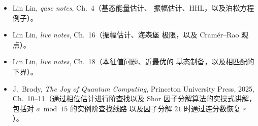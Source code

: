 \readingsection
\begin{itemize}[leftmargin=1.4em]
  \item Lin Lin, \emph{qasc notes}, Ch.~4（基态能量估计、
        振幅估计、HHL，以及泊松方程例子）。
  \item Lin Lin, \emph{live notes}, Ch.~16（振幅估计、海森堡
        极限，以及 Cram\'er--Rao 观点）。
  \item Lin Lin, \emph{live notes}, Ch.~18（本征值问题、近最优的
        基态制备，以及相匹配的下界）。
  \item J.~Brody, \emph{The Joy of Quantum Computing}, Princeton University
        Press, 2025, Ch.~10--11（通过相位估计进行阶查找以及 Shor
        因子分解算法的实操式讲解，包括对 $a\bmod 15$ 的实例阶查找线路
        以及因子分解 $21$ 时通过连分数恢复 $r$）。
\end{itemize}
